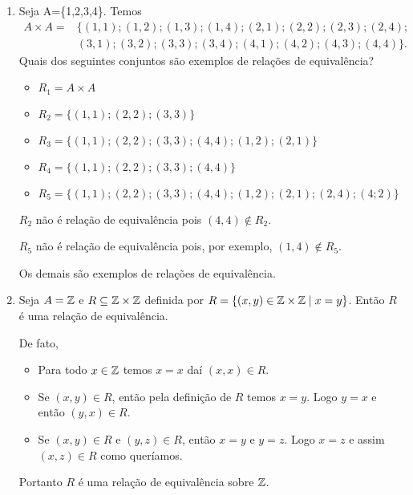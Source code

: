 \begin{exemplos}\label{exemplos_relacoes_equivalencia}
	\begin{enumerate}[label={\arabic*})]
		\item Seja A=\{1,2,3,4\}. Temos
		\begin{align*}
			A\times A = &\{(1,1);(1,2);(1,3);(1,4);(2,1);(2,2);(2,3);(2,4);\\ &(3,1);(3,2);(3,3);(3,4);(4,1);(4,2);(4,3);(4,4)\}.
		\end{align*}
		Quais dos seguintes conjuntos são exemplos de rela{\c c}{\~o}es de equival{\^e}ncia?
		\begin{itemize}
			\item $R_{1}= A\times A$
			\item $R_{2}=\{(1,1);(2,2);(3,3)\}$
			\item $R_{3}=\{(1,1);(2,2);(3,3);(4,4);(1,2);(2,1)\}$
			\item $R_{4}=\{(1,1);(2,2);(3,3);(4,4)\}$
			\item $R_{5}=\{(1,1);(2,2);(3,3);(4,4);(1,2);(2,1);(2,4);(4;2)\}$
		\end{itemize}
		\begin{solucao}
			$R_2$ não é relação de equivalência pois $(4,4) \notin R_2$.

			$R_5$ não é relação de equivalência pois, por exemplo, $(1,4) \notin R_5$.

			Os demais são exemplos de relações de equivalência.
		\end{solucao}
		
		\item Seja $A = \mathbb{Z}$ e $R\subseteq \mathbb{Z}\times \mathbb{Z}$ definida por $R = \{(x,y)\in \mathbb{Z} \times \mathbb{Z} \mid x = y\}$.
		Então $R$ {\'e} uma rela{\c c}{\~a}o de equival{\^e}ncia.
		\begin{solucao}
			De fato,
			\begin{itemize}
				\item Para todo $x \in \mathbb{Z}$ temos $x = x$ daí $(x,x) \in R$.
				\item Se $(x,y)\in R$, então pela definição de $R$ temos $x = y$. Logo $y = x$ e então $(y,x)\in R$.
				\item Se $(x,y) \in R$ e $(y,z) \in R$, então  $x = y$ e $y = z$. Logo $x = z$ e assim $(x,z)\in R$ como queríamos.
			\end{itemize}
			Portanto $R$ é uma relação de equivalência sobre $\mathbb{Z}$.
		\end{solucao}
		

\end{enumerate}
\end{exemplos}
